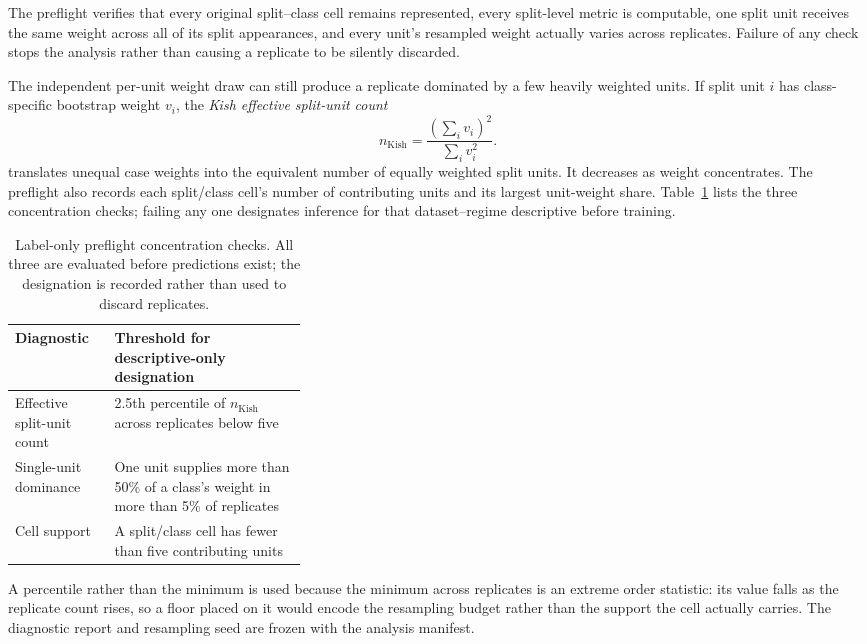 \documentclass[11pt]{article}
\begin{document}
\noindent The preflight verifies that every original split--class cell remains represented, every split-level metric is computable, one split unit receives the same weight across all of its split appearances, and every unit's resampled weight actually varies across replicates. Failure of any check stops the analysis rather than causing a replicate to be silently discarded.

The independent per-unit weight draw can still produce a replicate dominated by a few heavily weighted units. If split unit $i$ has class-specific bootstrap weight $v_i$, the \emph{Kish effective split-unit count}
\begin{equation}
  n_{\mathrm{Kish}}=\frac{\left(\sum_i v_i\right)^2}{\sum_i v_i^2}.
  \label{eq:kish}
\end{equation}
\noindent translates unequal case weights into the equivalent number of equally weighted split units. It decreases as weight concentrates. The preflight also records each split/class cell's number of contributing units and its largest unit-weight share. Table~\ref{tab:preflight} lists the three concentration checks; failing any one designates inference for that dataset--regime descriptive before training.

\begin{table}[ht]
  \centering
  \footnotesize
  \begin{tabularx}{\linewidth}{@{}>{\raggedright\arraybackslash}p{0.34\linewidth}X@{}}
    \toprule
    Diagnostic & Threshold for descriptive-only designation \\
    \midrule
    Effective split-unit count & 2.5th percentile of $n_{\mathrm{Kish}}$ across replicates below five \\
    Single-unit dominance & One unit supplies more than 50\% of a class's weight in more than 5\% of replicates \\
    Cell support & A split/class cell has fewer than five contributing units \\
    \bottomrule
  \end{tabularx}
  \caption{Label-only preflight concentration checks. All three are evaluated before predictions exist; the designation is recorded rather than used to discard replicates.}
  \label{tab:preflight}
\end{table}

\noindent A percentile rather than the minimum is used because the minimum across replicates is an extreme order statistic: its value falls as the replicate count rises, so a floor placed on it would encode the resampling budget rather than the support the cell actually carries. The diagnostic report and resampling seed are frozen with the analysis manifest.
\end{document}
